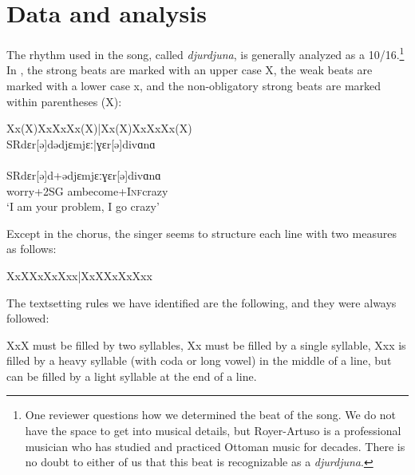 \documentclass[output=paper,colorlinks,citecolor=brown]{langscibook}
\begin{document}
\section{Data and analysis}

The rhythm used in the song, called \textit{djurdjuna}, is generally analyzed as a 10/16.\footnote{One reviewer questions how we determined the beat of the song.  We do not have the space to get into musical details, but Royer-Artuso is a professional musician who has studied and practiced Ottoman music for decades.  There is no doubt to either of us that this beat is recognizable as a \textit{djurdjuna}.}  In , the strong beats are marked with an upper case X, the weak beats are marked with a lower case x, and the non-obligatory strong beats are marked within parentheses (X):

\begin{exe}
    \ex \label{baronian:ex9} \tab Xx(X)\tab \tab	   	Xx\tab	Xx\tab     Xx(X)\tab	|\tab	Xx(X)\tab	\tab  	 Xx\tab	Xx\tab     Xx(X)\\
SR\tab	dɛr[ə]dəd\tab	jɛm\tab     jɛː\tab	\tab	|\tab	ɣɛr[ə]\tab \tab	  	 di\tab	vɑ\tab      nɑ\\
\\
SR\tab	dɛr[ə]d+əd\tab     	jɛm\tab     	jɛːɣɛr[ə]\tab \tab \tab	\tab 			divɑnɑ\\
\tab \tab worry+2SG \tab   	am\tab   	become+\textsc{Inf}\tab   \tab  	\tab 	crazy\\
‘I am your problem, I go crazy’

\end{exe}

Except in the chorus, the singer seems to structure each line with two measures as follows: 

\begin{exe}
    \ex \label{baronian:ex10} XxX\tab	   Xx\tab	Xx\tab     Xxx\tab		\tab|\tab	XxX\tab	   Xx\tab	Xx\tab     Xxx
\end{exe}


The textsetting rules we have identified are the following, and they were always followed:

\begin{exe}
    \ex \label{baronian:ex11}
    \begin{xlist}
        \ex XxX must be filled by two syllables,
        \ex Xx must be filled by a single syllable,
        \ex Xxx is filled by a heavy syllable (with coda or long vowel) in the middle of a line, but can be filled by a light syllable at the end of a line.
    \end{xlist}
\end{exe}
\end{document}
